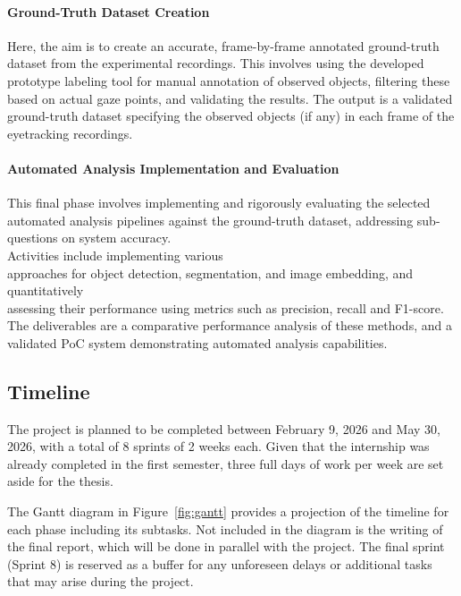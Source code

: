 \documentclass[english]{hogent-article}
\begin{document}
\paragraph{Ground-Truth Dataset Creation\\}
Here, the aim is to create an accurate, frame-by-frame annotated ground-truth dataset from the experimental recordings. 
This involves using the developed prototype labeling tool for manual annotation of observed objects, 
filtering these based on actual gaze points, and validating the results.
The output is a validated ground-truth dataset specifying the observed objects (if any) in each frame of the eyetracking recordings.

\paragraph{Automated Analysis Implementation and Evaluation\\}
This final phase involves implementing and rigorously evaluating the selected automated analysis pipelines 
against the ground-truth dataset, addressing sub-questions on system accuracy.\\
Activities include implementing various\\ approaches for object detection, segmentation, and image embedding, and quantitatively\\
assessing their performance using metrics such as precision, recall and F1-score. 
The deliverables are a comparative performance analysis of these methods, and a validated PoC system demonstrating automated analysis capabilities.

\subsection{Timeline}

The project is planned to be completed between February 9, 2026 and May 30, 2026, with a total of 8 sprints of 2 weeks each.
Given that the internship was already completed in the first semester, three full days of work per week are set aside for the thesis.

The Gantt diagram in Figure~\ref{fig:gantt} provides a projection of the timeline for each phase including its subtasks.
Not included in the diagram is the writing of the final report, which will be done in parallel with the project.
The final sprint (Sprint 8) is reserved as a buffer for any unforeseen delays or additional tasks that may arise during the project.
\end{document}
